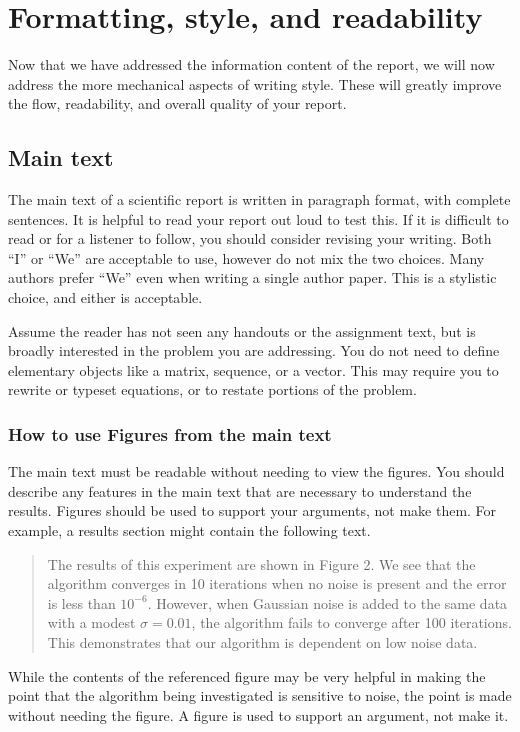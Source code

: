 \documentclass[]{article}
\begin{document}
\section{Formatting, style, and readability}

Now that we have addressed the information content of the report, we will now address the more mechanical aspects of writing style. These will greatly improve the flow, readability, and overall quality of your report.

\subsection{Main text}
The main text of a scientific report is written in paragraph format, with complete sentences. It is helpful to read your report out loud to test this. If it is difficult to read or for a listener to follow, you should consider revising your writing. Both ``I'' or ``We'' are acceptable to use, however do not mix the two choices. Many authors prefer ``We'' even when writing a single author paper. This is a stylistic choice, and either is acceptable.


Assume the reader has not seen any handouts or the assignment text, but is broadly interested in the problem you are addressing. You do not need to define elementary objects like a matrix, sequence, or a vector.
This may require you to rewrite or typeset equations, or to restate portions of the problem.

\subsubsection{How to use Figures from the main text}
The main text must be readable without needing to view the figures. You should describe any features in the main text that are necessary to understand the results. Figures should be used to support your arguments, not make them. For example, a results section might contain the following text.
\begin{quote}
    The results of this experiment are shown in Figure 2. We see that the algorithm converges in 10 iterations when no noise is present and the error is less than $10^{-6}$. However, when Gaussian noise is added to the same data with a modest $\sigma=0.01$, the algorithm fails to converge after 100 iterations. This demonstrates that our algorithm is dependent on low noise data.
\end{quote}

While the contents of the referenced figure may be very helpful in making the point that the algorithm being investigated is sensitive to noise, the point is made without needing the figure. A figure is used to support an argument, not make it.
\end{document}

